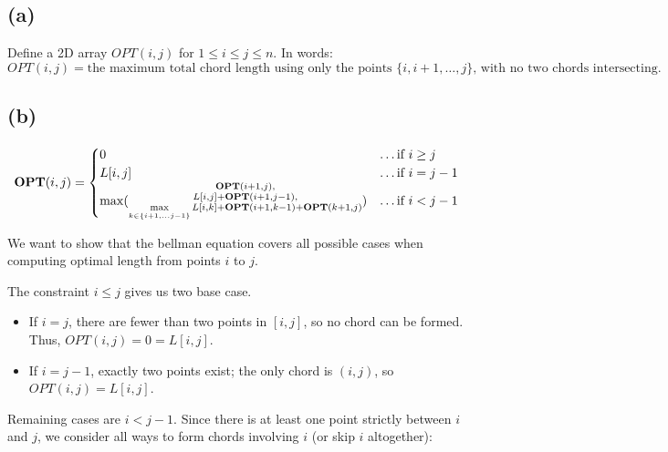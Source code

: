 
\subsection*{(a)}
Define a 2D array $OPT(i,j)$ for $1 \le i \le j \le n$. In words:
\[
OPT(i,j) = 
\text{the maximum total chord length using only the points }
\{i, i+1, \dots, j\} \text{, with no two chords intersecting.}
\]



\subsection*{(b)}

\begin{equation}
    \begin{split}
        \textbf{OPT}(i, j) = \begin{cases}
                        0 & \dots \text{if } i \geq j \\
                        L[i, j] & \dots \text{if } i = j - 1\\
                    \max(\substack{\textbf{OPT}(i + 1, j), \\
                                   L[i, j] + \textbf{OPT}(i + 1, j - 1), \\
                                   \max\limits_{k \in \{i + 1, ... j - 1\}} L[i,k] + \textbf{OPT}(i + 1, k - 1) + \textbf{OPT}(k + 1, j)}) & \dots \text{if } i < j - 1
                    \end{cases}
    \end{split}
\end{equation}


We want to show that the bellman equation covers all possible cases when computing optimal length from points $i$ to $j$.

The constraint $i \leq j$ gives us two base case.
\begin{itemize}
    \item If $i = j$, there are fewer than two points in $[i,j]$, so no chord can be formed. Thus, $OPT(i,j) = 0 = L[i,j]$.
    \item If $i = j - 1$, exactly two points exist; the only chord is $(i,j)$, so $OPT(i,j) = L[i,j]$.
\end{itemize}

Remaining cases are $i < j - 1$.
Since there is at least one point strictly between $i$ and $j$, we consider all ways to form chords involving $i$ (or skip $i$ altogether):

